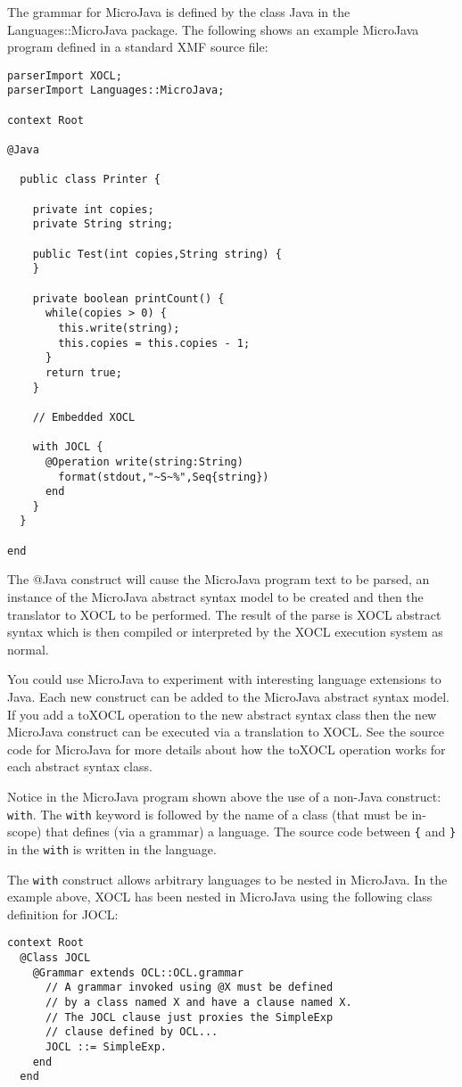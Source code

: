The grammar for MicroJava is defined by the class Java in the Languages::MicroJava
package. The following shows an example MicroJava program defined in a standard
XMF source file:
\begin{lstlisting}
parserImport XOCL;
parserImport Languages::MicroJava;
 
context Root
 
@Java
 
  public class Printer {
 
    private int copies;
    private String string;
 
    public Test(int copies,String string) {
    }
 
    private boolean printCount() {
      while(copies > 0) {
        this.write(string);
	    this.copies = this.copies - 1;
      }
      return true;
    }
 
    // Embedded XOCL
 
    with JOCL {
      @Operation write(string:String)
        format(stdout,"~S~%",Seq{string})
      end 
    }
  }
 
end
\end{lstlisting}
The @Java construct will cause the MicroJava program text to be parsed,
an instance of the MicroJava abstract syntax model to be created and then 
the translator to XOCL to be performed. The result of the parse is XOCL
abstract syntax which is then compiled or interpreted by the XOCL
execution system as normal.

You could use MicroJava to experiment with interesting language
extensions to Java. Each new construct can be added to the MicroJava
abstract syntax model. If you add a toXOCL operation to the new
abstract syntax class then the new MicroJava construct can be executed
via a translation to XOCL. See the source code for MicroJava for more
details about how the toXOCL operation works for each abstract syntax
class.

Notice in the MicroJava program shown above the use of a non-Java 
construct: {\tt with}. The {\tt with} keyword is followed by the
name of a class (that must be in-scope) that defines (via a grammar) 
a language. The source code between {\tt \{} and {\tt \}} in the {\tt with}
is written in the language.

The {\tt with} construct allows arbitrary languages to be nested
in MicroJava. In the example above, XOCL has been nested in MicroJava using
the following class definition for JOCL:
\begin{lstlisting}
context Root
  @Class JOCL
    @Grammar extends OCL::OCL.grammar
      // A grammar invoked using @X must be defined
      // by a class named X and have a clause named X.
      // The JOCL clause just proxies the SimpleExp
      // clause defined by OCL...
      JOCL ::= SimpleExp.
    end
  end
\end{lstlisting}


